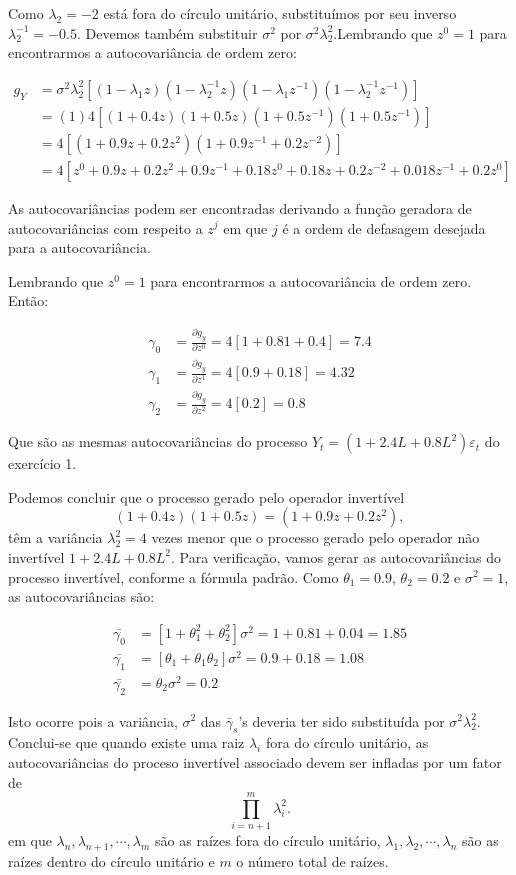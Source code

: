 \begin{enumerate}
				Como $\lambda_2=-2$ está fora do círculo unitário, substituímos por seu inverso $\lambda_2^{-1}=-0.5$. Devemos também substituir $\sigma^2$ por $\sigma^2\lambda_2^2$.Lembrando que $z^0=1$ para encontrarmos a autocovariância de ordem zero:
				
				\begin{align*}
					g_Y&=\sigma^2\lambda_2^2[(1-\lambda_1z)(1-\lambda_2^{-1}z)(1-\lambda_1z^{-1})(1-\lambda_2^{-1}z^{-1})]\\
					&=(1)4[(1+0.4z)(1+0.5z)(1+0.5z^{-1})(1+0.5z^{-1})]\\
					&=4[(1+0.9z+0.2z^2)(1+0.9z^{-1}+0.2z^{-2})]\\
					&=4[z^0+0.9z+0.2z^2+0.9z^{-1}+0.18z^0+0.18z+0.2z^{-2}+0.018z^{-1}+0.2z^0]
				\end{align*}
				
				As autocovariâncias podem ser encontradas derivando a função geradora de autocovariâncias com respeito a $z^j$ em que $j$ é a ordem de defasagem desejada para a autocovariância.
				
				Lembrando que $z^0=1$ para encontrarmos a autocovariância de ordem zero. Então:
				
				\begin{align*}
					\gamma_0&=\frac{\partial g_y}{\partial z^0}	= 4[1+0.81+0.4]=7.4\\
					\gamma_1&=\frac{\partial g_y}{\partial z^1} = 4[0.9+0.18]=4.32\\
					\gamma_2&=\frac{\partial g_y}{\partial z^2} = 4[0.2]=0.8
				\end{align*}
			
		Que são as mesmas autocovariâncias do processo $Y_t=(1+2.4L+0.8L^2)\varepsilon_t$ do exercício 1.
					
					
				
	Podemos concluir que o processo gerado pelo operador invertível $$(1+0.4z)(1+0.5z)=(1+0.9z+0.2z^2),$$ têm a variância $\lambda_2^2=4$ vezes menor que o processo gerado pelo operador não invertível $1+2.4L+0.8L^2$. Para verificação, vamos gerar as autocovariâncias do processo invertível, conforme a fórmula padrão. Como $\theta_1=0.9$, $\theta_2=0.2$ e $\sigma^2=1$, as autocovariâncias são:
	
	\begin{align*}
		\bar{\gamma_0}&=[1+\theta_1^2+\theta_2^2]\sigma^2=1+0.81+0.04=1.85\\
		\bar{\gamma_1}&=[\theta_1+\theta_1\theta_2]\sigma^2=0.9+0.18=1.08\\
		\bar{\gamma_2}&=\theta_2\sigma^2=0.2
	\end{align*}

	Isto ocorre pois a variância, $\sigma^2$ das $\bar{\gamma}_s$'s deveria ter sido substituída por $\sigma^2\lambda^2_2$. Conclui-se que quando existe uma raiz $\lambda_i$ fora do círculo unitário, as autocovariâncias do proceso invertível associado devem ser infladas por um fator de $$\prod\limits_{i=n+1}^{m}\lambda_i^2.$$ em que $\lambda_n, \lambda_{n+1},\cdots, \lambda_m$ são as raízes fora do círculo unitário, $\lambda_1, \lambda_{2},\cdots, \lambda_n$ são as raízes dentro do círculo unitário e $m$ o número total de raízes.

\end{enumerate}